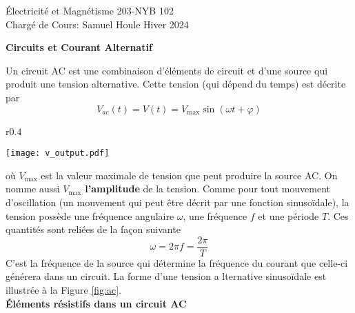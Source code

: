 \documentclass[titlepage,oneside,a4paper,11pt]{book} %
\begin{document}
{Électricité et Magnétisme}
\hfill
{203-NYB 102} \\ 
{Chargé de Cours: Samuel Houle}
\hfill
{Hiver 2024}\\
\begin{center}
\textbf{Circuits et Courant Alternatif}
\end{center}

Un circuit AC est une combinaison d'éléments de circuit et d'une source qui produit une tension alternative.  Cette tension (qui dépend du temps) est décrite par
\begin{equation}
V_{ac}(t) = V(t) = V_{\mathrm{max}}\sin{(\omega t+\varphi)}
\label{eq:alt}
\end{equation}
\begin{wrapfigure}{r}{0.4\textwidth}
  \begin{center}
    \texttt{[image: v\_output.pdf]}
    \caption{Tension en fonction du temps à la sortie d'une source de tension alternative.}
    \label{fig:ac}
  \end{center}
\end{wrapfigure}
où $V_{\mathrm{max}}$ est la valeur maximale de tension que peut produire la source AC. On nomme aussi $V_{\mathrm{max}}$ \textbf{l'amplitude} de la tension. Comme pour tout mouvement d'oscillation (un mouvement qui peut être décrit par une fonction sinusoïdale), la tension possède une fréquence angulaire $\omega$, une fréquence $f$ et une période $T$.  Ces quantités sont reliées de la façon suivante
\begin{equation*}
\omega = 2\pi f = \frac{2\pi}{T}
\end{equation*}
C'est la fréquence de la source qui détermine la fréquence du courant que celle-ci générera dans un circuit. La forme d'une tension a lternative sinusoïdale est illustrée à la Figure \ref{fig:ac}.\\

\textbf{Éléments résistifs dans un circuit AC}\\
\end{document}
